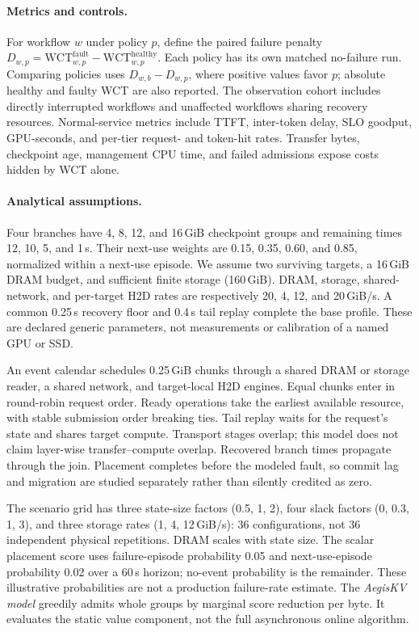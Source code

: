 \documentclass[sigplan,10pt,anonymous,nonacm]{acmart}
\begin{document}
\paragraph{Metrics and controls.}
For workflow $w$ under policy $p$, define the paired failure penalty
$D_{w,p}=\mathrm{WCT}^{\mathrm{fault}}_{w,p}-\mathrm{WCT}^{\mathrm{healthy}}_{w,p}$.
Each policy has its own matched no-failure run. Comparing policies uses
$D_{w,b}-D_{w,p}$, where positive values favor $p$; absolute healthy and
faulty WCT are also reported. The observation cohort includes directly
interrupted workflows and unaffected workflows sharing recovery resources.
Normal-service metrics include TTFT, inter-token delay, SLO goodput,
GPU-seconds, and per-tier request- and token-hit rates. Transfer bytes,
checkpoint age, management CPU time, and failed admissions expose costs
hidden by WCT alone.

\paragraph{Analytical assumptions.}
Four branches have 4, 8, 12, and 16\,GiB checkpoint groups and remaining
times 12, 10, 5, and 1\,s. Their next-use weights are 0.15, 0.35, 0.60,
and 0.85, normalized within a next-use episode. We assume two surviving
targets, a 16\,GiB DRAM budget, and sufficient finite storage (160\,GiB).
DRAM, storage, shared-network, and per-target H2D rates are respectively
20, 4, 12, and 20\,GiB/s. A common 0.25\,s recovery floor and 0.4\,s tail
replay complete the base profile. These are declared generic parameters,
not measurements or calibration of a named GPU or SSD.

An event calendar schedules 0.25\,GiB chunks through a shared DRAM or
storage reader, a shared network, and target-local H2D engines. Equal
chunks enter in round-robin request order. Ready operations take the
earliest available resource, with stable submission order breaking ties.
Tail replay waits for the request's state and shares target compute.
Transport stages overlap; this model does not claim layer-wise
transfer--compute overlap. Recovered branch times propagate through the
join. Placement completes before the modeled fault, so commit lag and
migration are studied separately rather than silently credited as zero.

The scenario grid has three state-size factors (0.5, 1, 2), four slack
factors (0, 0.3, 1, 3), and three storage rates (1, 4, 12\,GiB/s): 36
configurations, not 36 independent physical repetitions. DRAM scales with
state size. The scalar placement score uses failure-episode probability
0.05 and next-use-episode probability 0.02 over a 60\,s horizon; no-event
probability is the remainder. These illustrative probabilities are not a
production failure-rate estimate. The \emph{AegisKV model} greedily admits
whole groups by marginal score reduction per byte. It evaluates the
static value component, not the full asynchronous online algorithm.
\end{document}
